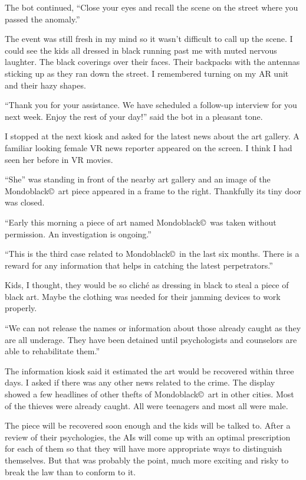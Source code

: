 The bot continued, ``Close your eyes and recall the scene on the
street where you passed the anomaly.''

The event was still fresh in my mind so it wasn't difficult to
call up the scene. I could see the kids all dressed in black
running past me with muted nervous laughter. The black coverings
over their faces. Their backpacks with the antennas sticking up
as they ran down the street. I remembered turning on my AR unit
and their hazy shapes.

``Thank you for your assistance. We have scheduled a follow-up
interview for you next week. Enjoy the rest of your
day!'' said the bot in a pleasant tone.

I stopped at the next kiosk and asked for the latest news about the
art gallery. A familiar looking female VR news reporter appeared
on the screen. I think I had seen her before in VR movies.

``She'' was standing in front of the nearby art gallery and an
image of the Mondoblack\copyright\ art piece appeared in a frame
to the right. Thankfully its tiny door was closed.

``Early this morning a piece of art named Mondoblack\copyright\
was taken without permission. An investigation is ongoing.''

``This is the third case related to Mondoblack\copyright\ in the
last six months.  There is a reward for any information that
helps in catching the latest perpetrators.''

Kids, I thought, they would be so clich\'{e} as dressing in
black to steal a piece of black art. Maybe the clothing was
needed for their jamming devices to work properly.

``We can not release the names or information about
those already caught as they are all underage. They have been
detained until psychologists and counselors are able to
rehabilitate them.''

The information kiosk said it estimated the art would be
recovered within three days. I asked if there was any other news
related to the crime. The display showed a few headlines of
other thefts of Mondoblack\copyright\ art in other cities. Most
of the thieves were already caught. All were teenagers and
most all were male.

The piece will be recovered soon enough and the kids will be
talked to. After a review of their psychologies, the AIs will
come up with an optimal prescription for each of them so that
they will have more appropriate ways to distinguish themselves.
But that was probably the point, much more exciting and risky to
break the law than to conform to it.


